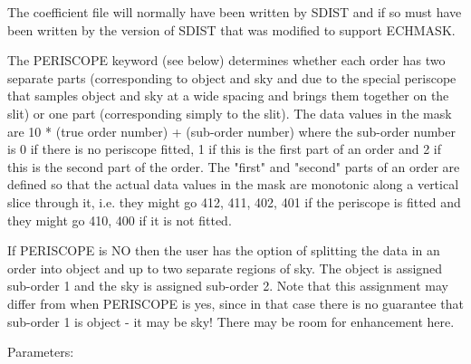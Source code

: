 \begin{description}
\begin{description}
\begin{terminalv}
    The coefficient file will normally have been written by SDIST and
    if so must have been written by the version of SDIST that was
    modified to support ECHMASK.

    The PERISCOPE keyword (see below) determines whether each order
    has two separate parts (corresponding to object and sky and due to
    the special periscope that samples object and sky at a wide
    spacing and brings them together on the slit) or one part
    (corresponding simply to the slit).  The data values in the mask
    are 10 * (true order number) + (sub-order number) where the
    sub-order number is 0 if there is no periscope fitted, 1 if this
    is the first part of an order and 2 if this is the second part of
    the order. The "first" and "second" parts of an order are defined
    so that the actual data values in the mask are monotonic along a
    vertical slice through it, i.e. they might go 412, 411, 402, 401 if
    the periscope is fitted and they might go 410, 400 if it is not
    fitted.

    If PERISCOPE is NO then the user has the option of splitting
    the data in an order into object and up to two separate regions of
    sky. The object is assigned sub-order 1 and the sky is assigned
    sub-order 2. Note that this assignment may differ from when
    PERISCOPE is yes, since in that case there is no guarantee that
    sub-order 1 is object - it may be sky!  There may be room for
    enhancement here.

 Parameters:


\end{terminalv}
\end{description}
\end{description}
